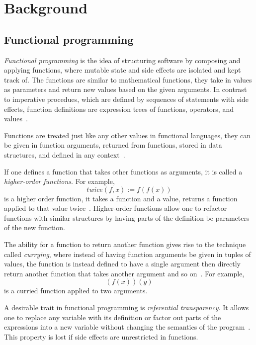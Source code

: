 \chapter{Background}\label{ch:background}

\section{Functional programming}\label{sec:functional}

\emph{Functional programming} is the idea of structuring software by composing
and applying functions, where mutable state and side effects are isolated and
kept track of. The functions are similar to mathematical functions, they take in
values as parameters and return new values based on the given arguments. In
contrast to imperative procedues, which are defined by sequences of statements
with side effects, function definitions are expression trees of functions,
operators, and values~\cite{functional-Hudak, functional-Hughes}.

Functions are treated just like any other values in functional languages, they
can be given in function arguments, returned from functions, stored in data
structures, and defined in any context~\cite{functional-Hudak, sicp}.

If one defines a function that takes other functions as arguments, it is called
a \emph{higher-order functions}. For example,
\begin{equation}
  \mathit{twice}(f, x) := f(f(x))
  \label{eq:higher-order-ex}
\end{equation}
is a higher order function, it takes a function and a value, returns a function
applied to that value twice~\cite{functional-Hudak}. Higher-order functions
allow one to refactor functions with similar structures by having parts of the
definition be parameters of the new function.

The ability for a function to return another function gives rise to the
technique called \emph{currying}, where instead of having function arguments be
given in tuples of values, the function is instead defined to have a single
argument then directly return another function that takes another argument and
so on~\cite{functional-Hudak, functional-Barendregt, combinator-Curry}. For
example,
\begin{equation}
  (f(x))(y)
  \label{eq:curry-ex}
\end{equation}
is a curried function applied to two arguments.

A desirable trait in functional programming is \emph{referential transparency}.
It allows one to replace any variable with its definition or factor out parts of
the expressions into a new variable without changing the semantics of the
program~\cite{functional-Hudak, functional-Hughes, functional-Barendregt}. This
property is lost if side effects are unrestricted in functions.

